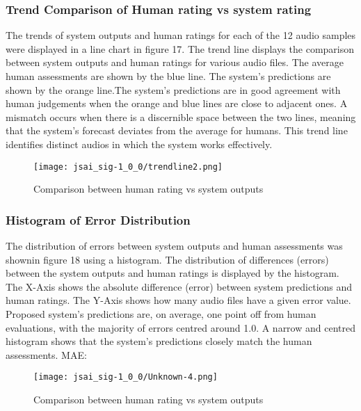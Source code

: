\documentclass[a4j, twocolumn]{article}
\begin{document}
\subsubsection{Trend Comparison of  Human rating  vs system rating }
The trends of system outputs and human ratings for each of the 12 audio samples were displayed in a line chart in figure 17. The trend line displays the comparison between system outputs and human ratings for various audio files. The average human assessments are shown by the blue line. The system's predictions are shown by the orange line.The system's predictions are in good agreement with human judgements when the orange and blue lines are close to adjacent ones.  A mismatch occurs when there is a discernible space between the two lines, meaning that the system's forecast deviates from the average for humans. This trend line identifies distinct audios in which the system works effectively.
\vspace{10pt} %
\begin{figure}[H]
    \centering
    \texttt{[image: jsai\_sig-1\_0\_0/trendline2.png]}
    \caption{Comparison between human rating vs system outputs}
    \label{fig:system_architecture}
\end{figure} 
\vspace{10pt} %
\subsubsection{Histogram of Error Distribution}
The distribution of errors between system outputs and human assessments was shownin figure 18 using a histogram. The distribution of differences (errors) between the system outputs and human ratings is displayed by the histogram. The X-Axis shows the absolute difference (error) between system predictions and human ratings. The Y-Axis shows how many audio files have a given error value. 
Proposed system's predictions are, on average, one point off from human evaluations, with the majority of errors centred around 1.0. A narrow and centred histogram shows that the system's predictions closely match the human assessments. 
MAE: 
\vspace{10pt} %
 \begin{figure}[H]
    \centering
    \texttt{[image: jsai\_sig-1\_0\_0/Unknown-4.png]}
    \caption{Comparison between human rating vs system outputs}
    \label{fig:system_architecture}
\end{figure}
\end{document}
